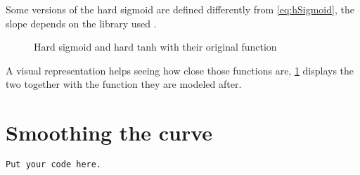 Some versions of the hard sigmoid are defined differently from \cref{eq:hSigmoid}, the slope depends on the library used \cite{hSigmoid1}.

\begin{figure}[H]
  \centering
  
  \caption{Hard sigmoid and hard \acs{tanh} with their original function}
  \label{graph:hardFunc}
\end{figure}

A visual representation helps seeing how close those functions are, \cref{graph:hardFunc} displays the two together with the function they are modeled after.

\section{Smoothing the curve}\label{apsec:smoothFunc}

\begin{lstlisting}[language=Python]
Put your code here.
\end{lstlisting}
